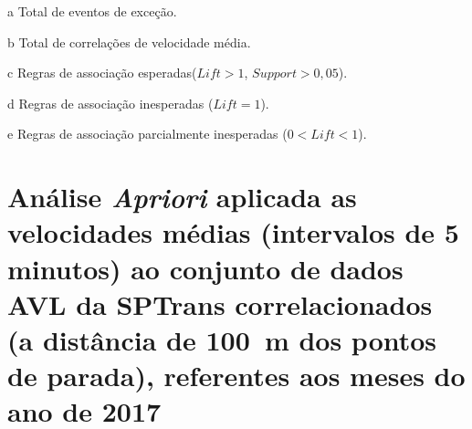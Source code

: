 \documentclass[
	12pt,				%
	oneside,			%
	a4paper,			%
	english,			%
	brazil				%
	]{abntex2ppgsi}
\begin{document}
{{\begin{apendicesenv}
\begin{table}[!htb]
\begin{threeparttable}
\begin{tablenotes}
            \item[a] Total de eventos de exceção.
            \item[b] Total de correlações de velocidade média.
            \item[c] Regras de associação esperadas($Lift > 1$, $Support > 0,05$).
            \item[d] Regras de associação inesperadas ($Lift = 1$).
            \item[e] Regras de associação parcialmente inesperadas ($0 < Lift < 1$).
        \end{tablenotes}
\end{threeparttable}
\end{table}

\clearpage

\section{Análise \textit{Apriori} aplicada as velocidades médias (intervalos de 5 minutos) ao conjunto de dados AVL da SPTrans correlacionados (a distância de 100~m dos pontos de parada), referentes aos meses do ano de 2017}
\label{g3}


\end{apendicesenv}}}
\end{document}
